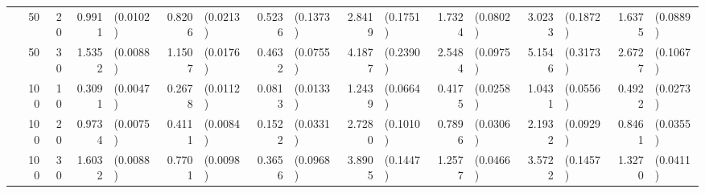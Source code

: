 \begin{landscape}
\begin{table}[H]
\begin{scriptsize}
\begin{tabular}{lrrrlrlrlrlrlrlrl}
    & 50 & 20 & 0.9911 & (0.0102) & 0.8206 & (0.0213) & 0.5236 & (0.1373) & 2.8419 & (0.1751) & 1.7324 & (0.0802) & 3.0233 & (0.1872) & 1.6375 & (0.0889) \\ 
    & 50 & 30 & 1.5352 & (0.0088) & 1.1507 & (0.0176) & 0.4632 & (0.0755) & 4.1877 & (0.2390) & 2.5484 & (0.0975) & 5.1546 & (0.3173) & 2.6727 & (0.1067) \\ 
    & 100 & 10 & 0.3091 & (0.0047) & 0.2678 & (0.0112) & 0.0813 & (0.0133) & 1.2439 & (0.0664) & 0.4175 & (0.0258) & 1.0431 & (0.0556) & 0.4922 & (0.0273) \\ 
    & 100 & 20 & 0.9734 & (0.0075) & 0.4111 & (0.0084) & 0.1522 & (0.0331) & 2.7280 & (0.1010) & 0.7896 & (0.0306) & 2.1932 & (0.0929) & 0.8461 & (0.0355) \\ 
    & 100 & 30 & 1.6032 & (0.0088) & 0.7701 & (0.0098) & 0.3656 & (0.0968) & 3.8905 & (0.1447) & 1.2577 & (0.0466) & 3.5722 & (0.1457) & 1.3270 & (0.0411) \\ 
   \hline
\end{tabular}
\end{scriptsize}
\end{table}
\end{landscape}


